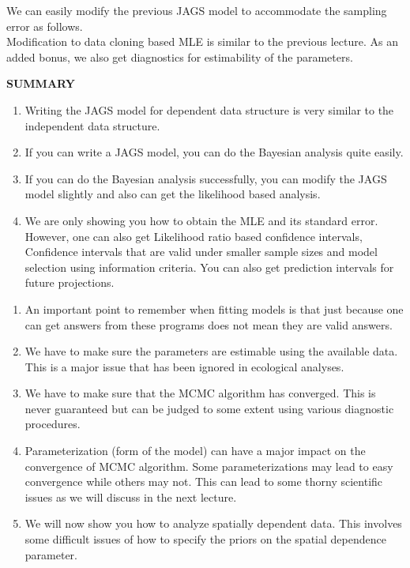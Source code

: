 \documentclass[10pt]{beamer}
\begin{document}
\begin{frame}
We can easily modify the previous JAGS model to accommodate the sampling error as follows.\\
\vspace{1em}
\pause
Modification to data cloning based MLE is similar to the previous lecture. As an added bonus, we also get diagnostics for estimability of the parameters.\\
\end{frame}

\begin{frame}
\begin{center}
\LARGE \textbf {SUMMARY}
\end{center}
\begin{enumerate}
\item Writing the JAGS model for dependent data structure is very similar to the independent data structure. 
\item If you can write a JAGS model, you can do the Bayesian analysis quite easily. 
\item If you can do the Bayesian analysis successfully, you can modify the JAGS model slightly and also can get the likelihood based analysis. 
\item We are only showing you how to obtain the MLE and its standard error. However, one can also get Likelihood ratio based confidence intervals, Confidence intervals that are valid under smaller sample sizes and model selection using information criteria. You can also get prediction intervals for future projections. 
\end{enumerate}
\end{frame}

\begin{frame}
\begin{enumerate}
\item An important point to remember when fitting models is that just because one can get answers from these programs does not mean they are valid answers.\\
\pause
\item We have to make sure the parameters are estimable using the available data. This is a major issue that has been ignored in ecological analyses. 
\pause
\item We have to make sure that the MCMC algorithm has converged. This is never guaranteed but can be judged to some extent using various diagnostic procedures. 
\pause
\item Parameterization (form of the model) can have a major impact on the convergence of MCMC algorithm. Some parameterizations may lead to easy convergence while others may not. This can lead to some thorny scientific issues as we will discuss in the next lecture. 
\pause
\item We will now show you how to analyze spatially dependent data. This involves some difficult issues of how to specify the priors on the spatial dependence parameter. 
\end{enumerate}
\end{frame}
\end{document}
